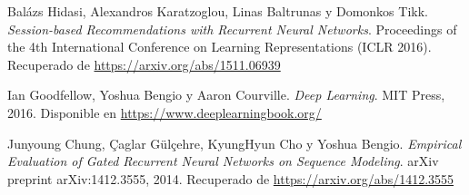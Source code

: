 \documentclass[runningheads]{llncs}
\begin{document}
\begin{thebibliography}{9}

Balázs Hidasi, Alexandros Karatzoglou, Linas Baltrunas y Domonkos Tikk.
\textit{Session-based Recommendations with Recurrent Neural Networks}. 
Proceedings of the 4th International Conference on Learning Representations (ICLR 2016). Recuperado de \url{https://arxiv.org/abs/1511.06939}

Ian Goodfellow, Yoshua Bengio y Aaron Courville.
\textit{Deep Learning}. MIT Press, 2016. Disponible en \url{https://www.deeplearningbook.org/}

Junyoung Chung, Çaglar Gülçehre, KyungHyun Cho y Yoshua Bengio.
\textit{Empirical Evaluation of Gated Recurrent Neural Networks on Sequence Modeling}. arXiv preprint arXiv:1412.3555, 2014. Recuperado de \url{https://arxiv.org/abs/1412.3555}

\end{thebibliography}
\end{document}
